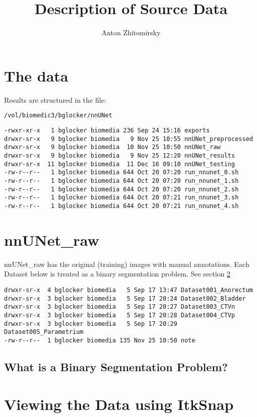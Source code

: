 \documentclass[11pt]{article}
\title{Description of Source Data}
\author{Anton Zhitomirsky}
\begin{document}
\maketitle

\section{The data}

Results are structured in the file:

\begin{lstlisting}[language=bash]
/vol/biomedic3/bglocker/nnUNet
\end{lstlisting}

\begin{lstlisting}[language=inform]
-rwxr-xr-x   1 bglocker biomedia 236 Sep 24 15:16 exports
drwxr-sr-x   9 bglocker biomedia   9 Nov 25 10:55 nnUNet_preprocessed
drwxr-sr-x   9 bglocker biomedia  10 Nov 25 10:50 nnUNet_raw
drwxr-sr-x   9 bglocker biomedia   9 Nov 25 12:20 nnUNet_results
drwxr-sr-x  11 bglocker biomedia  11 Dec 16 09:10 nnUNet_testing
-rw-r--r--   1 bglocker biomedia 644 Oct 20 07:20 run_nnunet_0.sh
-rw-r--r--   1 bglocker biomedia 644 Oct 20 07:20 run_nnunet_1.sh
-rw-r--r--   1 bglocker biomedia 644 Oct 20 07:20 run_nnunet_2.sh
-rw-r--r--   1 bglocker biomedia 644 Oct 20 07:21 run_nnunet_3.sh
-rw-r--r--   1 bglocker biomedia 644 Oct 20 07:21 run_nnunet_4.sh
\end{lstlisting}

\section*{nnUNet\_raw}

nnUNet\_raw has the original (training) images with manual annotations. Each Dataset below is treated as a binary segmentation problem. See section \ref{section:itksnap}

\begin{lstlisting}[language=inform]
drwxr-sr-x  4 bglocker biomedia   5 Sep 17 13:47 Dataset001_Anorectum
drwxr-sr-x  3 bglocker biomedia   5 Sep 17 20:24 Dataset002_Bladder
drwxr-sr-x  3 bglocker biomedia   5 Sep 17 20:27 Dataset003_CTVn
drwxr-sr-x  3 bglocker biomedia   5 Sep 17 20:28 Dataset004_CTVp
drwxr-sr-x  3 bglocker biomedia   5 Sep 17 20:29 Dataset005_Parametrium
-rw-r--r--  1 bglocker biomedia 135 Nov 25 10:50 note
\end{lstlisting}

\subsection*{What is a Binary Segmentation Problem?}

\section{Viewing the Data using ItkSnap} \label{section:itksnap}
\end{document}
